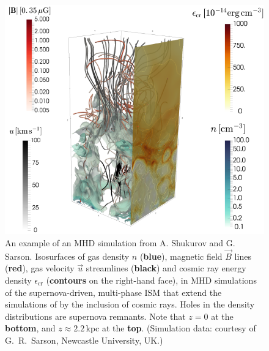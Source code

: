 


\begin{figure}[t]\centering
\includegraphics[width=0.7\columnwidth]{CR_box_low-res.png}
\caption{ An example of an MHD simulation from A. Shukurov and G. Sarson. Isosurfaces of gas density $n$ ({\bf blue}), magnetic field $\vec{B}$ lines ({\bf red}), gas 
velocity $\vec{u}$ streamlines ({\bf black}) and cosmic ray energy density $\epsilon_{\mathrm{cr}}$ ({\bf contours} 
on the right-hand face), in MHD simulations of the supernova-driven, multi-phase ISM 
that extend the simulations of 
\citet{Gent:2013b} 
by the inclusion 
of cosmic rays. Holes in the density distributions are supernova remnants. Note that 
$z=0$ at the \textbf{bottom}, and $z\approx 2.2$\,kpc at the \textbf{top}. 
(Simulation data: courtesy of G.~R.~Sarson, Newcastle University, UK.)
\label{fig:mhd}
}
\end{figure}



